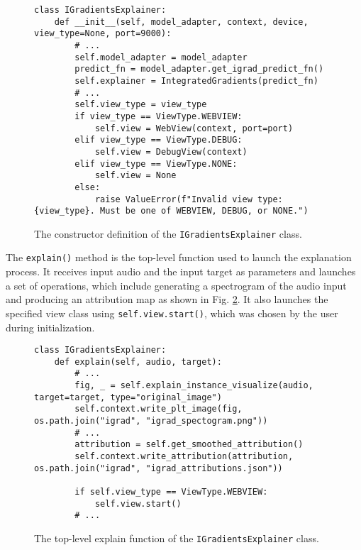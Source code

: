 \documentclass[
    bindingoffset=5mm,  %
    footnoteindent=3mm, %
    hyphenation=true    %
]{src/wut-thesis}
\begin{document}
\begin{figure}[h!]
\begin{verbatim}
class IGradientsExplainer:
    def __init__(self, model_adapter, context, device, view_type=None, port=9000):
        # ...
        self.model_adapter = model_adapter
        predict_fn = model_adapter.get_igrad_predict_fn()
        self.explainer = IntegratedGradients(predict_fn)
        # ...
        self.view_type = view_type
        if view_type == ViewType.WEBVIEW:
            self.view = WebView(context, port=port)
        elif view_type == ViewType.DEBUG:
            self.view = DebugView(context)
        elif view_type == ViewType.NONE:
            self.view = None
        else:
            raise ValueError(f"Invalid view type: {view_type}. Must be one of WEBVIEW, DEBUG, or NONE.")
\end{verbatim}
\caption{The constructor definition of the \texttt{IGradientsExplainer} class.}
\label{fig:IGradientsExplainer}
\end{figure}

The \texttt{explain()} method is the top-level function used to launch the explanation process.
It receives input audio and the input target as parameters and launches a set of operations,
which include generating a spectrogram of the audio input and producing an attribution map
as shown in Fig. \ref{fig:IgradMainExplainFunc}.
It also launches the specified view class using \texttt{self.view.start()},
which was chosen by the user during initialization.

\begin{figure}[h!]
\begin{verbatim}
class IGradientsExplainer:
    def explain(self, audio, target):
        # ...
        fig, _ = self.explain_instance_visualize(audio, target=target, type="original_image")
        self.context.write_plt_image(fig, os.path.join("igrad", "igrad_spectogram.png"))
        # ...
        attribution = self.get_smoothed_attribution()
        self.context.write_attribution(attribution, os.path.join("igrad", "igrad_attributions.json"))
       
        if self.view_type == ViewType.WEBVIEW:
            self.view.start()
        # ...
\end{verbatim}
\caption{The top-level explain function of the \texttt{IGradientsExplainer} class.}
\label{fig:IgradMainExplainFunc}
\end{figure}
\end{document}
